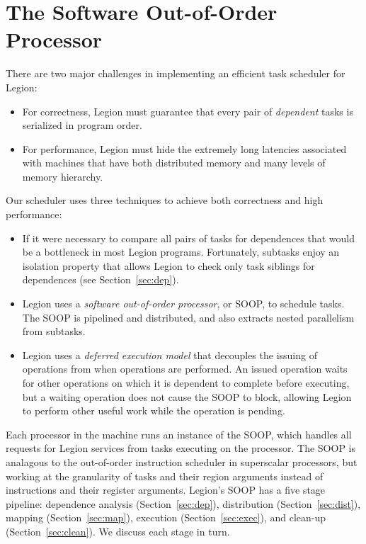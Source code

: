 \section{The Software Out-of-Order Processor}
\label{sec:soop}

There are two major challenges in implementing an efficient task
scheduler for Legion:
\begin{itemize}
\item  For correctness, Legion must guarantee that every pair of {\em dependent} tasks is serialized in program order.

\item For performance, Legion must hide the extremely long latencies associated
  with machines that have both distributed memory and many levels of
  memory hierarchy.
\end{itemize}
Our scheduler uses three techniques to achieve both correctness and high performance:
\begin{itemize}
\item If it were necessary to compare all pairs of tasks for dependences that 
would be a bottleneck in most Legion programs.  Fortunately,
subtasks enjoy an isolation property that allows Legion to check only task siblings for dependences
(see Section~\ref{sec:dep}).

\item Legion uses a {\em  software out-of-order processor}, or SOOP, to schedule tasks.  The SOOP 
is pipelined and distributed, and also extracts nested parallelism from subtasks.

\item Legion uses a {\em deferred execution model} that decouples the issuing
of operations from when operations are performed.  An issued operation waits for other operations on
which it is dependent to complete before executing, but a waiting operation does not cause the SOOP
to block, allowing Legion to perform other useful work while the operation is pending.  


\end{itemize}

Each processor in the machine runs an instance of the SOOP, which handles all requests
for Legion services from tasks executing on the processor.  The SOOP is analagous to the out-of-order
instruction scheduler in superscalar processors, but working at the granularity of tasks and their region
arguments instead of instructions and their register arguments.
Legion's SOOP has a five stage pipeline: dependence analysis (Section~\ref{sec:dep}),
distribution (Section~\ref{sec:dist}),
mapping (Section~\ref{sec:map}),
execution (Section~\ref{sec:exec}),
and clean-up (Section~\ref{sec:clean}).
We discuss each stage in turn.

